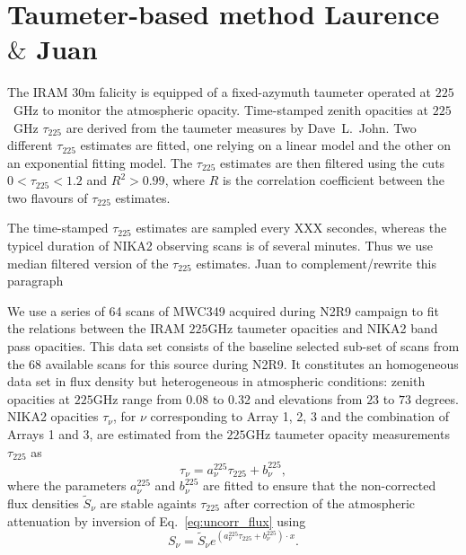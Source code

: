 \section{Taumeter-based method {\color{blue} Laurence $\&$ Juan}}
\label{se:taumeter-method}

The IRAM 30m falicity is equipped of a fixed-azymuth taumeter operated
at $225$~GHz to monitor the atmospheric opacity. Time-stamped
zenith opacities at $225$~GHz $\tau_{225}$ are derived from the
taumeter measures by Dave~L.~John. Two different $\tau_{225}$
estimates are fitted, one relying on a linear model and the other on
an exponential fitting model. The $\tau_{225}$ estimates are then
filtered using the cuts $0< \tau_{225} <1.2$ and $R^2 > 0.99$, where
$R$ is the correlation coefficient between the two flavours of
$\tau_{225}$ estimates. 

The time-stamped $\tau_{225}$ estimates are sampled every
{\color{magenta} XXX secondes}, whereas the typicel duration of NIKA2
observing scans is of several minutes. Thus we use median filtered
version of the $\tau_{225}$ estimates. {\color{magenta} Juan to
complement/rewrite this paragraph}



We use a series of 64 scans of MWC349
acquired during N2R9 campaign to fit the relations between the IRAM
$225$GHz taumeter opacities and NIKA2 band pass opacities. This data
set consists of the baseline selected sub-set of scans from the 68
available scans for this source during N2R9. It constitutes an
homogeneous data set in flux density but heterogeneous in atmospheric
conditions: zenith opacities at $225$GHz range from
0.08 to 0.32 and elevations from $23$ to $73$ degrees. NIKA2 opacities
$\tau_\nu$, for $\nu$ corresponding
to Array 1, 2, 3 and the combination of Arrays 1 and 3, are estimated
from the $225$GHz taumeter opacity measurements $\tau_{225}$ as
\begin{equation}  
  \tau_\nu =  a_\nu^{225}\tau_{225} + b_\nu^{225},          
\end{equation}
where the parameters $a_\nu^{225}$ and $b_\nu^{225}$ are fitted to ensure
that the non-corrected flux densities $\tilde{S}_\nu$ are stable againts
$\tau_{225}$ after correction of the atmospheric attenuation by
inversion of Eq.~\ref{eq:uncorr_flux} using 
\begin{equation}  
  S_\nu = \tilde{S}_\nu e^{(a_\nu^{225}\tau_{225} + b_\nu^{225}) \cdot x}.
  \label{eq:opacorr_taumeter}
\end{equation}

